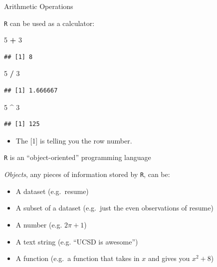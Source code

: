 \documentclass[ignorenonframetext,]{beamer}
\newenvironment{Shaded}{\begin{snugshade}}{\end{snugshade}}
\newcommand{\DecValTok}[1]{\textcolor[rgb]{0.00,0.00,0.81}{#1}}
\newcommand{\StringTok}[1]{\textcolor[rgb]{0.31,0.60,0.02}{#1}}
\newcommand{\OperatorTok}[1]{\textcolor[rgb]{0.81,0.36,0.00}{\textbf{#1}}}
\providecommand{\tightlist}{%
	\setlength{\itemsep}{0pt}\setlength{\parskip}{0pt}}
\begin{document}
\begin{frame}[fragile]{Arithmetic Operations}

\texttt{R} can be used as a calculator:

\begin{Shaded}
\begin{Highlighting}[]
\DecValTok{5} \OperatorTok{+}\StringTok{ }\DecValTok{3}
\end{Highlighting}
\end{Shaded}

\begin{verbatim}
## [1] 8
\end{verbatim}

\begin{Shaded}
\begin{Highlighting}[]
\DecValTok{5} \OperatorTok{/}\StringTok{ }\DecValTok{3}
\end{Highlighting}
\end{Shaded}

\begin{verbatim}
## [1] 1.666667
\end{verbatim}

\begin{Shaded}
\begin{Highlighting}[]
\DecValTok{5} \OperatorTok{^}\StringTok{ }\DecValTok{3}
\end{Highlighting}
\end{Shaded}

\begin{verbatim}
## [1] 125
\end{verbatim}

\begin{itemize}
\tightlist
\item
  The {[}1{]} is telling you the row number.
\end{itemize}

\end{frame}

\begin{frame}[fragile]{\texttt{R} is an ``object-oriented'' programming
language}

\emph{Objects}, any pieces of information stored by \texttt{R}, can be:

\begin{itemize}
\tightlist
\item
  A dataset (e.g.~resume)
\item
  A subset of a dataset (e.g.~just the even observations of resume)
\item
  A number (e.g. \(2\pi + 1\))
\item
  A text string (e.g. ``UCSD is awesome'')
\item
  A function (e.g.~a function that takes in \(x\) and gives you
  \(x^2 + 8\))
\end{itemize}

\end{frame}
\end{document}
